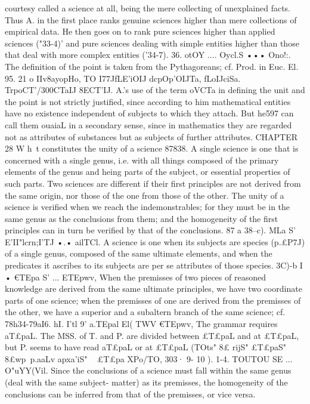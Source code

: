 {{{{{{{{{{{{{{{{{{{{{{{{{{{{{{{{{{courtesy called a science at all, being the mere collecting of
unexplained facts.
Thus A. in the first place ranks genuine sciences higher than
mere collections of empirical data. He then goes on to rank pure
sciences higher than applied sciences ("33-4)' and pure sciences
dealing with simple entities higher than those that deal with
more complex entities ('34-7).
36. otOY .... Oycl.S ••• Ono!:. The definition of the point is taken
from the Pythagoreans; cf. Prod. in Euc. El. 95. 21 o{ IIv8ayopHo,
TO I77JfLE'iOIJ dcpOp{'OIJTa, fLoIJciSa. TrpoCT'\a/300CTaIJ 8ECT'IJ. A.'s use of the
term oVCT{a in defining the unit and the point is not strictly
justified, since according to him mathematical entities have no
existence independent of subjects to which they attach. But he597
can call them ouaiaL in a secondary sense, since in mathematics
they are regarded not as attributes of substances but as subjects
of further attributes.
CHAPTER 28
W h~t constitutes the unity of a science
87838. A single science is one that is concerned with a single
genus, i.e. with all things composed of the primary elements of
the genus and heing parts of the subject, or essential properties
of such parts. Two sciences are different if their first principles
are not derived from the same origin, nor those of the one from
those of the other. The unity of a science is verified when we
reach the indemonstrables; for they must be in the same genus
as the conclusions from them; and the homogeneity of the first
principles can in turn be verified by that of the conclusions.
87 a 38--c). MLa S' E'II"lcrn;I'TJ •.• ailTCl. A science is one when its
subjects are species (p.£P7J) of a single genus, composed of the
same ultimate elements, and when the predicates it ascribes to
its subjects are per se attributes of those species.
3C)-b I • €TEpa S' ... ETEpwv, When the premisses of two pieces
of reasoned knowledge are derived from the same ultimate
principles, we have two coordinate parts of one science; when the
premisses of one are derived from the premisses of the other, we
have a superior and a subaltern branch of the same science;
cf. 78h34-79aI6.
hI. I'tl 9' a.TEpal El( TWV €TEpwv, The grammar requires aT£paL.
The MSS. of T. and P. are divided between £T£paL and at £T£paL,
but P. seems to have read aT£paL or at £T£paL (TOts" 8£ rijS" £T£paS"
8£wp~p.aaLv apxa'iS" ~ £T£pa XPo/TO, 303· 9- 10 ).
1-4. TOUTOU SE ... O"uYY(Vil. Since the conclusions of a science
must fall within the same genus (deal with the same subject-
matter) as its premisses, the homogeneity of the conclusions can
be inferred from that of the premisses, or vice versa.
}}}}}}}}}}}}}}}}}}}}}}}}}}}}}}}}}}}}}
